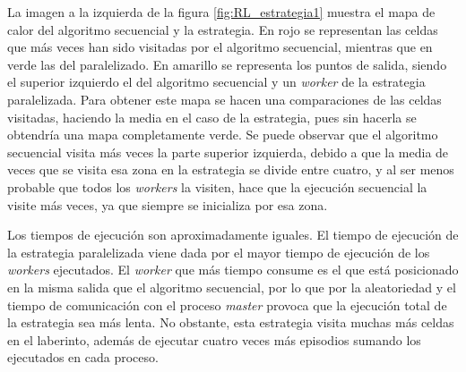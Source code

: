		La imagen a la izquierda de la figura \ref{fig:RL_estrategia1} muestra el mapa de calor del algoritmo secuencial y la estrategia. En rojo se representan las celdas que más veces han sido visitadas por el algoritmo secuencial, mientras que en verde las del paralelizado. En amarillo se representa los puntos de salida, siendo el superior izquierdo el del algoritmo secuencial y un \textit{worker} de la estrategia paralelizada. Para obtener este mapa se hacen una comparaciones de las celdas visitadas, haciendo la media en el caso de la estrategia, pues sin hacerla se obtendría una mapa completamente verde. Se puede observar que el algoritmo secuencial visita más veces la parte superior izquierda, debido a que la media de veces que se visita esa zona en la estrategia se divide entre cuatro, y al ser menos probable que todos los \textit{workers} la visiten, hace que la ejecución secuencial la visite más veces, ya que siempre se inicializa por esa zona. 
		
		Los tiempos de ejecución son aproximadamente iguales. El tiempo de ejecución de la estrategia paralelizada viene dada por el mayor tiempo de ejecución de los \textit{workers} ejecutados. El \textit{worker} que más tiempo consume es el que está posicionado en la misma salida que el algoritmo secuencial, por lo que por la aleatoriedad y el tiempo de comunicación con el proceso \textit{master} provoca que la ejecución total de la estrategia sea más lenta. No obstante, esta estrategia visita muchas más celdas en el laberinto, además de ejecutar cuatro veces más episodios sumando los ejecutados en cada proceso.		
		

